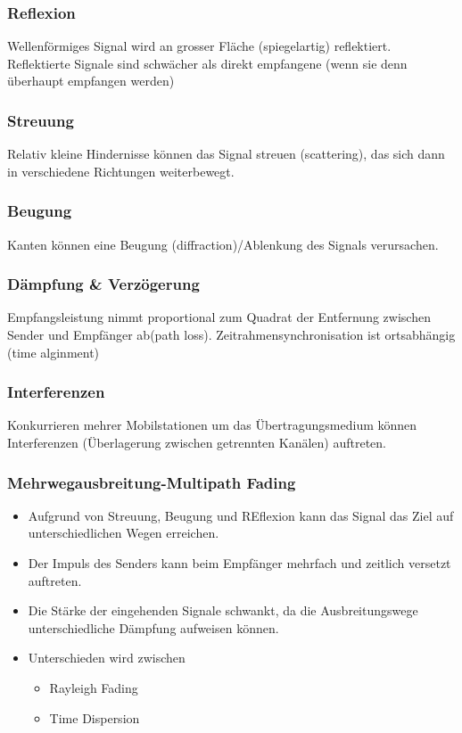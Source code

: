\subsubsection{Reflexion}
Wellenförmiges Signal wird an grosser Fläche (spiegelartig) reflektiert. Reflektierte Signale sind schwächer als direkt empfangene (wenn sie denn überhaupt empfangen werden)

\subsubsection{Streuung}
Relativ kleine Hindernisse können das Signal streuen (scattering), das sich dann in verschiedene Richtungen weiterbewegt.

\subsubsection{Beugung}
Kanten können eine Beugung (diffraction)/Ablenkung des Signals verursachen.

\subsubsection{Dämpfung \& Verzögerung}
Empfangsleistung nimmt proportional zum Quadrat der Entfernung zwischen Sender und Empfänger ab(path loss). Zeitrahmensynchronisation ist ortsabhängig (time alginment)

\subsubsection{Interferenzen}
Konkurrieren mehrer Mobilstationen um das Übertragungsmedium können Interferenzen (Überlagerung zwischen getrennten Kanälen) auftreten.

\subsubsection{Mehrwegausbreitung-Multipath Fading}
\begin{itemize}
\item Aufgrund von Streuung, Beugung und REflexion kann das Signal das Ziel auf unterschiedlichen Wegen erreichen.
\item Der Impuls des Senders kann beim Empfänger mehrfach und zeitlich versetzt auftreten.
\item Die Stärke der eingehenden Signale schwankt, da die Ausbreitungswege unterschiedliche Dämpfung aufweisen können.
\item Unterschieden wird zwischen 
\begin{itemize}
\item Rayleigh Fading 
\item Time Dispersion
\end{itemize}
\end{itemize}
